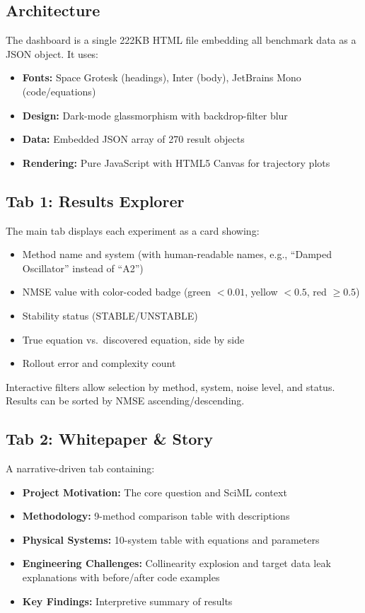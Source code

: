 \documentclass[conference]{IEEEtran}
\begin{document}
\subsection{Architecture}
The dashboard is a single 222KB HTML file embedding all benchmark data as a JSON object. It uses:
\begin{itemize}
    \item \textbf{Fonts:} Space Grotesk (headings), Inter (body), JetBrains Mono (code/equations)
    \item \textbf{Design:} Dark-mode glassmorphism with backdrop-filter blur
    \item \textbf{Data:} Embedded JSON array of 270 result objects
    \item \textbf{Rendering:} Pure JavaScript with HTML5 Canvas for trajectory plots
\end{itemize}

\subsection{Tab 1: Results Explorer}
The main tab displays each experiment as a card showing:
\begin{itemize}
    \item Method name and system (with human-readable names, e.g., ``Damped Oscillator'' instead of ``A2'')
    \item NMSE value with color-coded badge (green $< 0.01$, yellow $< 0.5$, red $\geq 0.5$)
    \item Stability status (STABLE/UNSTABLE)
    \item True equation vs.\ discovered equation, side by side
    \item Rollout error and complexity count
\end{itemize}
Interactive filters allow selection by method, system, noise level, and status. Results can be sorted by NMSE ascending/descending.

\subsection{Tab 2: Whitepaper \& Story}
A narrative-driven tab containing:
\begin{itemize}
    \item \textbf{Project Motivation:} The core question and SciML context
    \item \textbf{Methodology:} 9-method comparison table with descriptions
    \item \textbf{Physical Systems:} 10-system table with equations and parameters
    \item \textbf{Engineering Challenges:} Collinearity explosion and target data leak explanations with before/after code examples
    \item \textbf{Key Findings:} Interpretive summary of results
\end{itemize}
\end{document}
